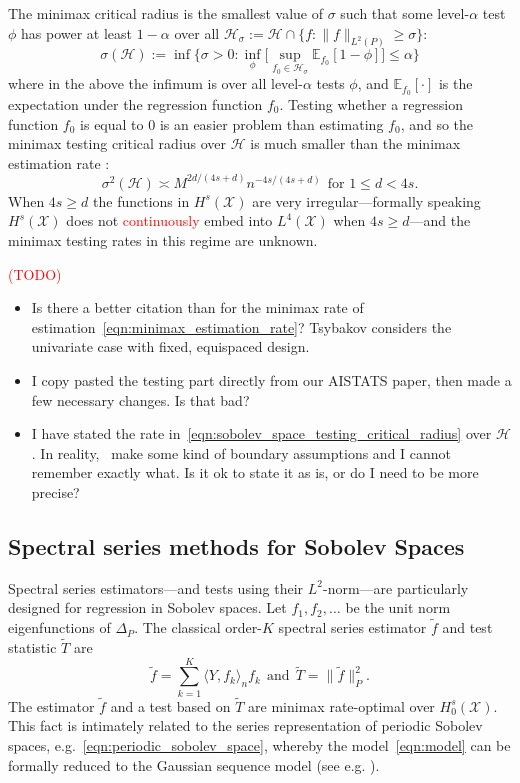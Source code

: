 \documentclass{article}
\newcommand{\1}{\mathbf{1}}
\newcommand{\Xset}{\mathcal{X}}
\newcommand{\Leb}{L}
\newcommand{\mc}[1]{\mathcal{#1}}
\newcommand{\Ebb}{\mathbb{E}}
\newcommand{\dotp}[2]{\langle #1, #2 \rangle}
\newcommand{\wt}[1]{\widetilde{#1}}
\theoremstyle{alden}
\theoremstyle{aldenthm}
\theoremstyle{definition}
\theoremstyle{remark}
\begin{document}
The minimax critical radius is the smallest value of $\sigma$ such that some level-${\alpha}$ test $\phi$ has power at least $1 - \alpha$ over all $\mc{H}_{\sigma} := \mc{H} \cap \{f: \|f\|_{\Leb^2(P)} \geq \sigma\}$:
\begin{equation*}
\sigma(\mc{H}) := \inf\Biggl\{\sigma > 0: \inf_{\phi} \biggl[ \sup_{f_0 \in \mc{H}_{\sigma}} \Ebb_{f_0}[1 - \phi]\biggr] \leq \alpha\Biggr\}
\end{equation*} 
where in the above the infimum is over all level-$\alpha$ tests $\phi$, and $\Ebb_{f_0}[\cdot]$ is the expectation under the regression function $f_0$. Testing whether a regression function $f_0$ is equal to $0$ is an easier problem than estimating $f_0$, and so the minimax testing critical radius over $\mc{H}$ is much smaller than the minimax estimation rate \citep{ingster2009}:
\begin{equation}
\label{eqn:sobolev_space_testing_critical_radius}
\sigma^2(\mc{H}) \asymp M^{2d/(4s + d)}n^{-4s/(4s + d)}~~\textrm{for $1 \leq d < 4s$.}
\end{equation}
When $4s \geq d$ the functions in $H^s(\Xset)$ are very irregular---formally speaking $H^s(\Xset)$ does not \textcolor{red}{continuously} embed into $\Leb^4(\Xset)$ when $4s \geq d$---and the minimax testing rates in this regime are unknown.

\textcolor{red}{(TODO)}
\begin{itemize}
	\item Is there a better citation than \citet{tsybakov2008_book} for the minimax rate of estimation~\eqref{eqn:minimax_estimation_rate}? Tsybakov considers the univariate case with fixed, equispaced design.
	\item I copy pasted the testing part directly from our AISTATS paper, then made a few necessary changes. Is that bad?
	\item I have stated the rate in~\eqref{eqn:sobolev_space_testing_critical_radius} over $\mc{H}$. In reality,~\citep{ingster2009} make some kind of boundary assumptions and I cannot remember exactly what. Is it ok to state it as is, or do I need to be more precise?
\end{itemize}

\subsection{Spectral series methods for Sobolev Spaces}
Spectral series estimators---and tests using their $\Leb^2$-norm---are particularly designed for regression in Sobolev spaces. Let $f_1,f_2,\ldots$ be the unit norm eigenfunctions of $\Delta_P$. The classical order-$K$ spectral series estimator $\wt{f}$ and test statistic $\wt{T}$ are
\begin{equation*}
\wt{f} = \sum_{k = 1}^{K} \dotp{Y}{f_k}_n f_k~~\textrm{and}~~\wt{T} = \|\wt{f}\|_P^2.
\end{equation*}
The estimator $\wt{f}$ and a test based on $\wt{T}$ are minimax rate-optimal over $H_0^s(\mc{X})$. This fact is intimately related to the series representation of periodic Sobolev spaces, e.g.~\eqref{eqn:periodic_sobolev_space}, whereby the model~\eqref{eqn:model} can be formally reduced to the Gaussian sequence model (see e.g. \citep{tsybakov08,gine16}). 
\end{document}
